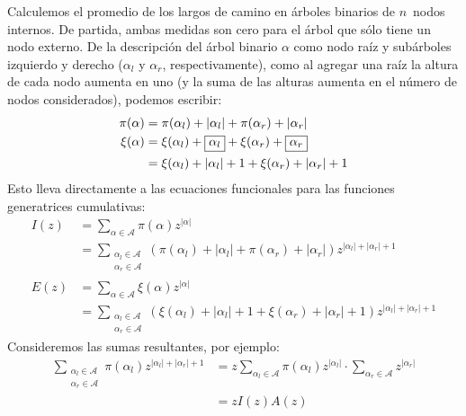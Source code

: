   Calculemos el promedio de los largos de camino
  en árboles binarios de \(n\)~nodos internos.
  De partida,
  ambas medidas son cero para el árbol que sólo tiene un nodo externo.
  De la descripción del árbol binario \(\alpha\)
  como nodo raíz y subárboles izquierdo y derecho
  (\(\alpha_l\) y \(\alpha_r\),
   respectivamente),
  como al agregar una raíz la altura de cada nodo aumenta en uno
  (y la suma de las alturas aumenta en el número de nodos considerados),
  podemos escribir:
  \begin{align}
    \pi(\alpha)
      &= \pi(\alpha_l) + \lvert \alpha_l \rvert
	  + \pi(\alpha_r) + \lvert \alpha_r \rvert
	      \label{eq:pi-decomposed} \\
    \xi(\alpha)
      &= \xi(\alpha_l) + \boxed{\alpha_l}
	  + \xi(\alpha_r) + \boxed{\alpha_r} \notag \\
      &= \xi(\alpha_l) + \lvert \alpha_l \rvert + 1
	  + \xi(\alpha_r) + \lvert \alpha_r \rvert + 1
	      \label{eq:xi-decomposed}
  \end{align}
  Esto lleva directamente a las ecuaciones funcionales
  para las funciones generatrices cumulativas:
  \begin{align}
    I(z)
      &= \sum_{\alpha \in \mathcal{A}} \pi(\alpha) z^{\lvert \alpha \rvert}
	   \label{eq:Ipi-def} \\
      &= \sum_{\substack{\alpha_l \in \mathcal{A} \\
			 \alpha_r \in \mathcal{A}}}
	       (\pi(\alpha_l) + \lvert \alpha_l \rvert
		  + \pi(\alpha_r) + \lvert \alpha_r \rvert)
	       z^{\lvert \alpha_l \rvert + \lvert \alpha_r \rvert + 1}
	   \label{eq:Ipi-decomposed} \\
    E(z)
      &= \sum_{\alpha \in \mathcal{A}} \xi(\alpha) z^{\lvert \alpha \rvert}
	   \label{eq:E-def} \\
      &= \sum_{\substack{\alpha_l \in \mathcal{A} \\
			 \alpha_r \in \mathcal{A}}}
	       (\xi(\alpha_l) + \lvert \alpha_l \rvert + 1
		  + \xi(\alpha_r) + \lvert \alpha_r \rvert + 1)
	       z^{\lvert \alpha_l \rvert + \lvert \alpha_r \rvert + 1}
	   \label{eq:E-decomposed}
  \end{align}
  Consideremos las sumas resultantes,
  por ejemplo:
  \begin{align*}
    \sum_{\substack{\alpha_l \in \mathcal{A} \\
		    \alpha_r \in \mathcal{A}}}
      \pi(\alpha_l) z^{\lvert \alpha_l \rvert + \lvert \alpha_r \rvert + 1}
      &= z \sum_{\alpha_l \in \mathcal{A}}
	     \pi(\alpha_l) z^{\lvert \alpha_l \rvert}
	   \cdot \sum_{\alpha_r \in \mathcal{A}} z^{\lvert \alpha_r \rvert} \\
      &= z I(z) A(z)
  \end{align*}
